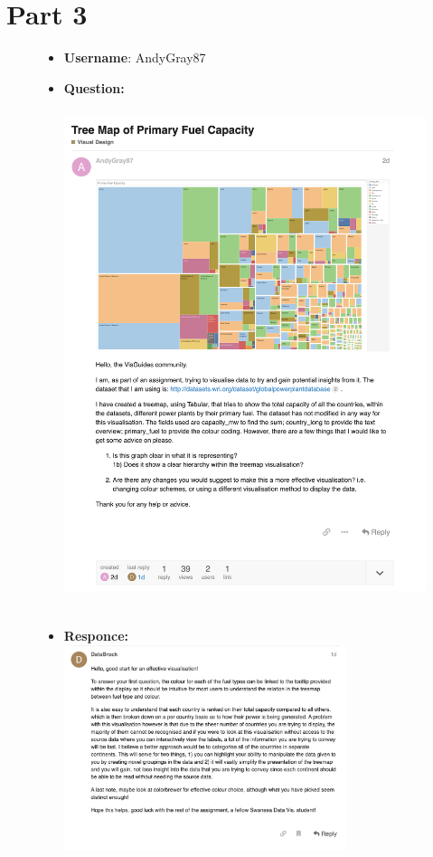 \hypertarget{part-3}{%
\section{Part 3}\label{part-3}}

\begin{figure}
\centering
\begin{itemize}
	\tightlist
	\item
	\textbf{Username}: AndyGray87
\end{itemize}
\begin{itemize}

	\tightlist
	\item
	\textbf{Question:}\\ \centering \includegraphics[height=15cm]{Question}
\end{itemize}
\clearpage
\begin{itemize}
	\newpage
	\tightlist
	\item
	\textbf{Responce:}\\ \centering \includegraphics[height=6cm]{answer}

\end{itemize}
\end{figure}
